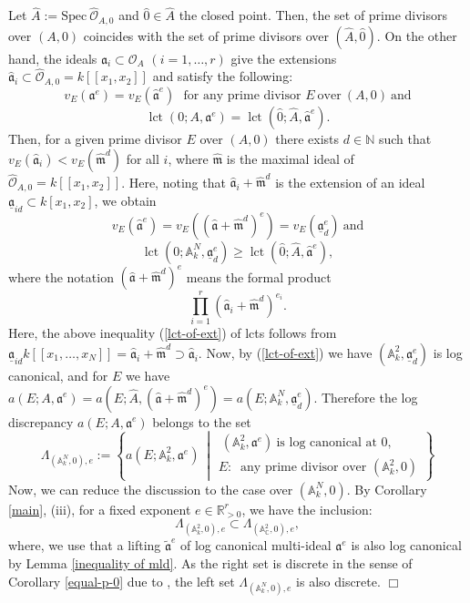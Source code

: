 \documentclass[a4paper]{amsart}
\def\AA{{\mathbb{A}}}
\def\RR{{\mathbb{R}}}
\def\CC{{\mathbb{C}}}
\def\NN{{\mathbb{N}}}
\renewcommand{\a}{{\mathfrak{a}}}
\newcommand{\oo}{{\mathcal O}}
\newcommand{\spec}{{\mathrm{Spec \ }}}
\newcommand{\m}{{\mathfrak{m}}}
\newcommand{\lct}{{\operatorname{lct}}}
\newcommand{\taa}{{\widetilde{\mathfrak a}}}
\theoremstyle{definition}
\begin{document}
\noindent
 Let $\widehat{A}:=\spec \widehat\oo_{A,0}$ and $\widehat0\in \widehat{A}$ the closed point.
    Then, the set of prime divisors over $(A,0)$ coincides with the set of  prime divisors over $(\widehat{A},\widehat0)$.
    On the other hand,  the ideals $\a_i\subset \oo_A$ $(i=1,\ldots,r)$ give the extensions    $\widehat\a_i\subset \widehat\oo_{A,0}=k[[x_1,x_2]]$ and satisfy the following:
    $$v_E(\a^e)=v_E(\widehat\a^e)\ \ \ \mbox{for\ any \ prime\ divisor\ } E \  \mbox{over} \ (A,0)\ \mbox{and}$$ 
\begin{equation}\label{lct-of-ext-1}    
    \lct (0;A, \a^e)=\lct (\widehat0; \widehat{A}, \widehat\a^e).
\end{equation}    
    Then, for a given prime divisor $E$ over $(A,0)$ there exists $d\in\NN$ such that 
    $v_E(\widehat\a_i)<v_E(\widehat\m^d)$ for all $i$, where $\widehat\m$ is the maximal ideal of $\widehat\oo_{A,0}
    =k[[x_1,x_2]]$.
    Here, noting that $\widehat\a_i+\widehat\m^d$ is the extension of an ideal $ \underline{\a}_{id}\subset k[x_1,x_2]$,
    we obtain
    $$v_E(\widehat\a^e)=v_E((\widehat\a+\widehat\m^d)^e)=v_E(\underline{\a}_{d}^e) \ \mbox{and}$$
 \begin{equation}\label{lct-of-ext}   
    \lct(0;\AA_k^N, \underline{\a}_{d}^e) \geq \lct (\widehat0; \widehat{A}, \widehat\a^e),
\end{equation}    
    where the notation $(\widehat\a+\widehat\m^d)^e$ means the formal product
    $$\prod_{i=1}^r(\widehat\a_i+\widehat\m^d)^{e_i}.$$
    Here, 
    the above inequality (\ref{lct-of-ext}) of lcts follows from $\underline{\a}_{id}k[[x_1,\ldots, x_N]]= \widehat\a_i+\widehat\m^d 
    \supset \widehat\a_i$.
    Now, by (\ref{lct-of-ext}) we have $(\AA_k^2, \underline\a_d^e)$ is log canonical, and for $E$ we have
     $a(E; A, \a^e)=a(E;\widehat{A}, (\widehat\a+\widehat\m^d)^e)=a(E; \AA_k^N, \underline{\a}_{d}^e)$.
     Therefore the log discrepancy   $a(E; A, \a^e)$   belongs to the set
 $$\Lambda_{(\AA_k^N,0),e}:= \left\{a(E;\AA_k^2,\a^e)  \ \middle | \begin{array}{l}\ (\AA_k^2, \a^e)\ \mbox{is\ log\ canonical\ at $0$}, 
         \\ E:\ \mbox{\ any \ prime divisor\ over } (\AA_k^2,0) \end{array}\right\} $$     
     Now, we can  reduce  the discussion to the case
    over $(\AA_k^N, 0)$.
      By  Corollary \ref{main}, (iii), for a fixed exponent $e\in \RR_{>0}^r$, 
     we have the inclusion:
     $$\Lambda_{(\AA_k^2,0),e}\subset \Lambda_{(\AA_\CC^2,0),e},$$
     where, we use that a lifting $\taa^e$ of log canonical multi-ideal $\a^e$ is also log canonical
     by Lemma \ref{inequality of mld}.
     As the right set is discrete in the sense of Corollary \ref{equal-p-0} due to \cite{kawk2}, the left set  $\Lambda_{(\AA_k^N,0),e}$ is also discrete.
     $\Box$   
  
\end{document}
